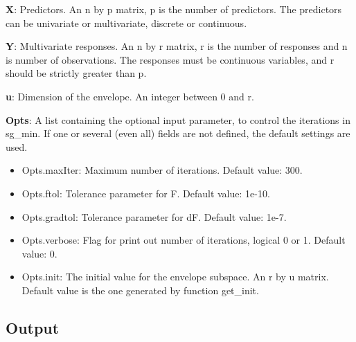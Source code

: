 \documentclass[a4paper,11pt,openany]{memoir}
\begin{document}
\begin{par}
\textbf{X}: Predictors. An n by p matrix, p is the number of predictors. The predictors can be univariate or multivariate, discrete or continuous.
\end{par} \vspace{1em}
\begin{par}
\textbf{Y}: Multivariate responses. An n by r matrix, r is the number of responses and n is number of observations. The responses must be continuous variables, and r should be strictly greater than p.
\end{par} \vspace{1em}
\begin{par}
\textbf{u}: Dimension of the envelope. An integer between 0 and r.
\end{par} \vspace{1em}
\begin{par}
\textbf{Opts}: A list containing the optional input parameter, to control the iterations in sg\_min. If one or several (even all) fields are not defined, the default settings are used.
\end{par} \vspace{1em}
\begin{itemize}
\setlength{\itemsep}{-1ex}
   \item Opts.maxIter: Maximum number of iterations.  Default value: 300.
   \item Opts.ftol: Tolerance parameter for F.  Default value: 1e-10.
   \item Opts.gradtol: Tolerance parameter for dF.  Default value: 1e-7.
   \item Opts.verbose: Flag for print out number of iterations, logical 0 or 1. Default value: 0.
      \item Opts.init: The initial value for the envelope subspace. An r by u matrix. Default value is the one generated by function get\_init.
\end{itemize}


\subsection*{Output}
\end{document}

